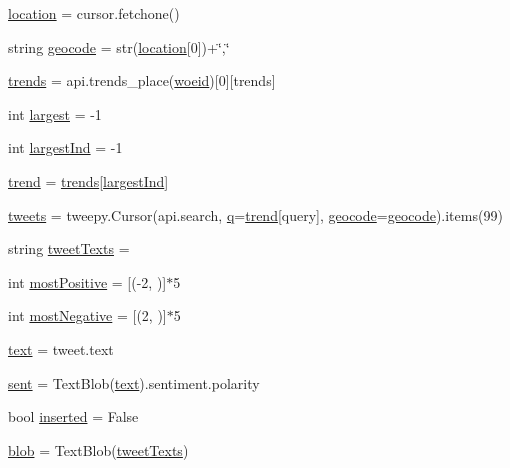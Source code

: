 \begin{DoxyCompactItemize}
\item 
\hyperlink{namespacebuildDatabase_ad2781a91cbfcd21e5be44aae5d39d257}{location} = cursor.\+fetchone()
\item 
string \hyperlink{namespacebuildDatabase_ac6de86e53e5b1e858c4bfc30606561e0}{geocode} = str(\hyperlink{namespacebuildDatabase_ad2781a91cbfcd21e5be44aae5d39d257}{location}\mbox{[}0\mbox{]})+\char`\"{},\char`\"{}
\item 
\hyperlink{namespacebuildDatabase_a00e15f8c5a38ef71e1176db990041ee0}{trends} = api.\+trends\+\_\+place(\hyperlink{namespacebuildDatabase_ada15f1ae1b075d6b5385c60ad0bcba7e}{woeid})\mbox{[}0\mbox{]}\mbox{[}\textquotesingle{}trends\textquotesingle{}\mbox{]}
\item 
int \hyperlink{namespacebuildDatabase_a1a68c0e0f8d22d281ad1a8b9024fd5d1}{largest} = -\/1
\item 
int \hyperlink{namespacebuildDatabase_abfd839e1a537e9e0ca132979eee02a28}{largest\+Ind} = -\/1
\item 
\hyperlink{namespacebuildDatabase_afe0b1b9174b6ce79a6fca681db02d2c6}{trend} = \hyperlink{namespacebuildDatabase_a00e15f8c5a38ef71e1176db990041ee0}{trends}\mbox{[}\hyperlink{namespacebuildDatabase_abfd839e1a537e9e0ca132979eee02a28}{largest\+Ind}\mbox{]}
\item 
\hyperlink{namespacebuildDatabase_a41e7e514b01675f060ab36db44904a13}{tweets} = tweepy.\+Cursor(api.\+search, \hyperlink{jquery-3_8js_aee3046c01d22ccd1efcb944608aec125}{q}=\hyperlink{namespacebuildDatabase_afe0b1b9174b6ce79a6fca681db02d2c6}{trend}\mbox{[}\textquotesingle{}query\textquotesingle{}\mbox{]}, \hyperlink{namespacebuildDatabase_ac6de86e53e5b1e858c4bfc30606561e0}{geocode}=\hyperlink{namespacebuildDatabase_ac6de86e53e5b1e858c4bfc30606561e0}{geocode}).items(99)
\item 
string \hyperlink{namespacebuildDatabase_a6b90ef6e990c311046eeaed437c20194}{tweet\+Texts} = \textquotesingle{}\textquotesingle{}
\item 
int \hyperlink{namespacebuildDatabase_a50f9b6bae964e6579ba92450127cf440}{most\+Positive} = \mbox{[}(-\/2, \textquotesingle{}\textquotesingle{})\mbox{]}$\ast$5
\item 
int \hyperlink{namespacebuildDatabase_adee8ced6b5216c8ebe3ad73fb6b9eb9a}{most\+Negative} = \mbox{[}(2, \textquotesingle{}\textquotesingle{})\mbox{]}$\ast$5
\item 
\hyperlink{namespacebuildDatabase_ad338d82c1c3c6c3d5df5034a51af3503}{text} = tweet.\+text
\item 
\hyperlink{namespacebuildDatabase_ab8145fb3b51cc107e9f177ffe6b4ab29}{sent} = Text\+Blob(\hyperlink{namespacebuildDatabase_ad338d82c1c3c6c3d5df5034a51af3503}{text}).sentiment.\+polarity
\item 
bool \hyperlink{namespacebuildDatabase_ab9d82862a48f7e4e725a899047b7ee75}{inserted} = False
\item 
\hyperlink{namespacebuildDatabase_a05391cf14f340a054d4f2c708576be29}{blob} = Text\+Blob(\hyperlink{namespacebuildDatabase_a6b90ef6e990c311046eeaed437c20194}{tweet\+Texts})
\end{DoxyCompactItemize}


